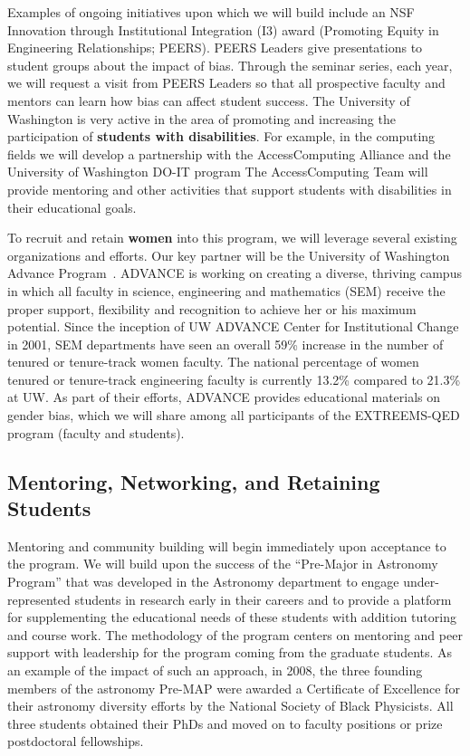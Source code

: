 Examples of ongoing initiatives upon which we will build include an
NSF Innovation through Institutional Integration (I3) award (Promoting
Equity in Engineering Relationships; PEERS). PEERS Leaders give
presentations to student groups about the impact of bias. Through the
seminar series, each year, we will request a visit from PEERS Leaders
so that all prospective faculty and mentors can learn how bias can
affect student success.  The University of Washington is very active
in the area of promoting and increasing the participation of {\bf
  students with disabilities}. For example, in the computing fields we
will develop a partnership with the AccessComputing Alliance
and the University
of Washington DO-IT program
The AccessComputing Team will provide mentoring and other activities
that support students with disabilities in their educational goals.

To recruit and retain {\bf women} into this program, we will leverage
several existing organizations and efforts.  Our key partner will be
the University of Washington Advance Program~\cite{}.  ADVANCE is
working on creating a diverse, thriving campus in which all faculty in
science, engineering and mathematics (SEM) receive the proper support,
flexibility and recognition to achieve her or his maximum
potential. Since the inception of UW ADVANCE Center for Institutional
Change in 2001, SEM departments have seen an overall 59\% increase in
the number of tenured or tenure-track women faculty. The national
percentage of women tenured or tenure-track engineering faculty is
currently 13.2\% compared to 21.3\% at UW. As part of their efforts,
ADVANCE provides educational materials on gender bias, which we will
share among all participants of the EXTREEMS-QED program (faculty and
students). 

\subsection{Mentoring, Networking, and Retaining Students}

Mentoring and community building will begin immediately upon
acceptance to the program. We will build upon the success of the
``Pre-Major in Astronomy Program'' \cite{garner2010diversity} that was
developed in the Astronomy department to engage under-represented
students in research early in their careers and to provide a platform
for supplementing the educational needs of these students with
addition tutoring and course work. The methodology of the program
centers on mentoring and peer support with leadership for the program
coming from the graduate students.  As an example of the impact of
such an approach, in 2008, the three founding members of the astronomy
Pre-MAP were awarded a Certificate of Excellence for their astronomy
diversity efforts by the National Society of Black Physicists. All
three students obtained their PhDs and moved on to faculty positions
or prize postdoctoral fellowships.

